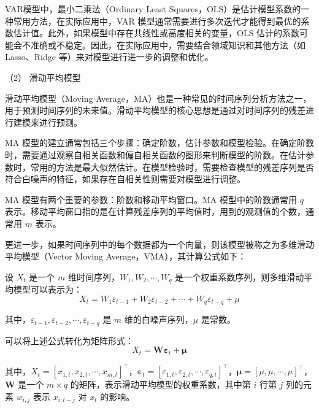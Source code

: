 \documentclass[master]{thesis-uestc}
\begin{document}

VAR模型中，最小二乘法（Ordinary Least Squares，OLS）是估计模型系数的一种常用方法，在实际应用中，VAR 模型通常需要进行多次迭代才能得到最优的系数估计值。此外，如果模型中存在共线性或高度相关的变量，OLS 估计的系数可能会不准确或不稳定。因此，在实际应用中，需要结合领域知识和其他方法（如 Lasso、Ridge 等）来对模型进行进一步的调整和优化。

（2） 滑动平均模型

滑动平均模型（Moving Average，MA）也是一种常见的时间序列分析方法之一，用于预测时间序列的未来值。滑动平均模型的核心思想是通过对时间序列的残差进行建模来进行预测。

MA 模型的建立通常包括三个步骤：确定阶数，估计参数和模型检验。在确定阶数时，需要通过观察自相关函数和偏自相关函数的图形来判断模型的阶数。在估计参数时，常用的方法是最大似然估计。在模型检验时，需要检查模型的残差序列是否符合白噪声的特征，如果存在自相关性则需要对模型进行调整。

MA 模型有两个重要的参数：阶数和移动平均窗口。MA 模型中的阶数通常用 $q$ 表示。移动平均窗口指的是在计算残差序列的平均值时，用到的观测值的个数，通常用 $m$ 表示。

更进一步，如果时间序列中的每个数据都为一个向量，则该模型被称之为多维滑动平均模型（Vector Moving Average，VMA），其计算公式如下：

设 $X_{t}$ 是一个 $m$ 维时间序列，$W_{1},W_{2},\cdots,W_{q}$ 是一个权重系数序列，则多维滑动平均模型可以表示为：
\begin{equation}
    X_{t} = W_{1}\varepsilon_{t-1} + W_{2}\varepsilon_{t-2} + \cdots + W_{q}\varepsilon_{t-q} + \mu 
\end{equation}


其中，$\varepsilon_{t-1},\varepsilon_{t-2},\cdots,\varepsilon_{t-q}$ 是 $m$ 维的白噪声序列，$\mu$ 是常数。

可以将上述公式转化为矩阵形式：
\begin{equation}
    X_t = \boldsymbol{W}\boldsymbol{\varepsilon}_{t} + \boldsymbol{\mu}
\end{equation}

其中，$X_t = [x_{1,t},x_{2,t},\cdots,x_{m,t}]^{\top}$，$\boldsymbol{\varepsilon}_{t} = [\varepsilon_{1,t},\varepsilon_{2,t},\cdots,\varepsilon_{q,t}]^{\top}$，$\boldsymbol{\mu} = [\mu,\mu,\cdots,\mu]^{\top}$，$\boldsymbol{W}$ 是一个 $m \times q$ 的矩阵，表示滑动平均模型的权重系数，其中第 $i$ 行第 $j$ 列的元素 $w_{i,j}$ 表示 $x_{i,t-j}$ 对 $x_{t}$ 的影响。
\end{document}
